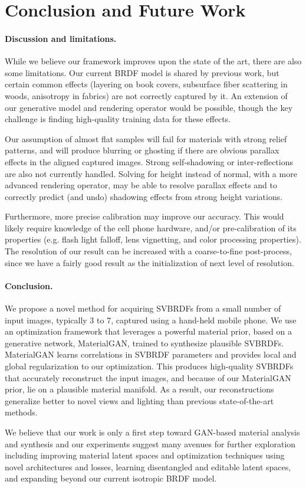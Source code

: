 \section{Conclusion and Future Work}
\label{sec:svbrdf:conclusion}

\paragraph{Discussion and limitations.}
While we believe our framework improves upon the state of the art, there are also some limitations. Our current BRDF model is shared by previous work, but certain common effects (layering on book covers, subsurface fiber scattering in woods, anisotropy in fabrics) are not correctly captured by it. An extension of our generative model and rendering operator would be possible, though the key challenge is finding high-quality  training data for these effects.

Our assumption of almost flat samples will fail for materials with strong relief patterns, and will produce blurring or ghosting if there are obvious parallax effects in the aligned captured images. Strong self-shadowing or inter-reflections are also not currently handled. Solving for height instead of normal, with a more advanced rendering operator, may be able to resolve parallax effects and to correctly predict (and undo) shadowing effects from strong height variations.

Furthermore, more precise calibration may improve our accuracy. This would likely require knowledge of the cell phone hardware, and/or pre-calibration of its properties (e.g. flash light falloff, lens vignetting, and color processing properties).
The resolution of our result can be increased with a coarse-to-fine post-process, since we have a fairly good result as the initialization of next level of resolution.

\paragraph{Conclusion.}
We propose a novel method for acquiring SVBRDFs from a small number of input images, typically 3 to 7, captured using a hand-held mobile phone.
We use an optimization framework that leverages a powerful material prior, based on a generative network, MaterialGAN, trained to synthesize plausible SVBRDFs.
MaterialGAN learns correlations in SVBRDF parameters and provides local and global regularization to our optimization.
This produces high-quality SVBRDFs that accurately reconstruct the input images, and because of our MaterialGAN prior, lie on a plausible material manifold.
As a result, our reconstructions generalize better to novel views and lighting than previous state-of-the-art methods.

We believe that our work is only a first step toward GAN-based material analysis and synthesis and our experiments suggest many avenues for further exploration including improving material latent spaces and optimization techniques using novel architectures and losses, learning disentangled and editable latent spaces, and expanding beyond our current isotropic BRDF model.


